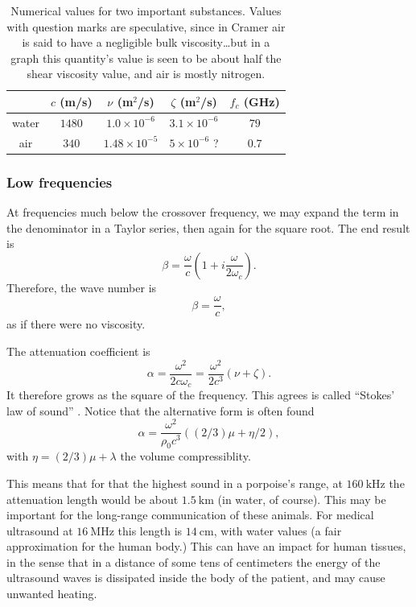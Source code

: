 \begin{table}
\begin{tabular}{|c|c|c|c|c|}
  \hline
    & $ c$ (m/s) &  $ \nu$ (m$^2$/s) & $\zeta$ (m$^2$/s) & $ f_c$ (GHz)\\
  \hline
  \hline
  water & $1480$& $ 1.0 \times 10^{-6}$ & $ 3.1 \times 10^{-6}$ & $79$ \\
  \hline
  air & $340$   & $ 1.48\times 10^{-5}$ & $ 5 \times 10^{-6}$ ? & $0.7$ \\
  \hline
\end{tabular}
\caption{Numerical values for two important substances. Values with
  question marks are speculative, since in Cramer\cite{Cramer} air is
  said to have a negligible bulk viscosity\ldots but in a graph this
  quantity's value is seen to be about half the shear viscosity value,
  and air is mostly nitrogen.
 \label{tbl:sound_att}}
\end{table}


\subsubsection{Low frequencies}


At frequencies much below the crossover frequency, we may expand the
term in the denominator in a Taylor series, then again for the square
root. The end result is
\[
\beta = \frac{\omega}{c} \left(1 + i   \frac{\omega}{2 \omega_c}\right).
\]
%
Therefore, the wave number is
\[
\beta = \frac{\omega}{c},
\]
as if there were no viscosity.

The attenuation coefficient is
\[ \alpha = \frac{\omega^2}{2 c\omega_c}=
\frac{\omega^2}{2 c^3}(\nu+\zeta). \]
%
It therefore grows as the square of the frequency.  This agrees is
called ``Stokes' law of sound'' . Notice
that the alternative form is often found \cite{kp:SloS}
\[
  \alpha =  \frac{\omega^2}{\rho_0 c^3}((2/3) \mu+\eta /2 ),
\]
with $\eta= (2/3) \mu + \lambda$ the volume compressiblity.

This means that for that the highest sound in a porpoise's range, at
$\SI{160}{\kilo\hertz}$ the attenuation length would be about
$\SI{1.5}{\kilo\meter}$ (in water, of course). This may be important
for the long-range communication of these animals. For medical
ultrasound at $\SI{16}{\mega\hertz}$ this length is
$\SI{14}{\centi\meter}$, with water values (a fair approximation for
the human body.) This can have an impact for human tissues, in the
sense that in a distance of some tens of centimeters the energy of the
ultrasound waves is dissipated inside the body of the patient, and may
cause unwanted heating.

